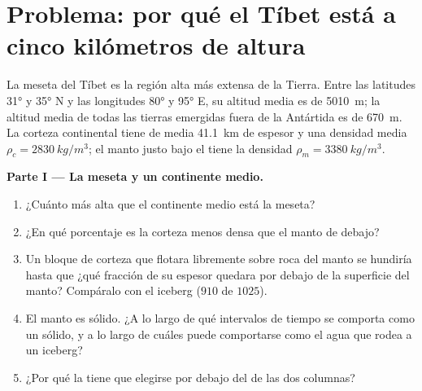 \section{Problema: por qué el Tíbet está a cinco kilómetros de altura}

\begin{problem}
\label{pb:g11:lithosphere-asthenosphere:1}
La meseta del Tíbet es la región alta más extensa de la Tierra. Entre las
latitudes \ang{31} y \ang{35} N y las longitudes \ang{80} y \ang{95} E, su
altitud media es de \qty{5010}{m}; la altitud media de todas las tierras
emergidas fuera de la Antártida es de \qty{670}{m}. La corteza continental
tiene de media \qty{41.1}{km} de espesor y una densidad media
$\rho_c = \qty{2830}{kg/m^3}$; el manto justo bajo el  tiene la densidad
$\rho_m = \qty{3380}{kg/m^3}$.

\medskip
\noindent\textbf{Parte I --- La meseta y un continente medio.}
\begin{enumerate}
  \item ¿Cuánto más alta que el continente medio está la meseta?
  \item ¿En qué porcentaje es la corteza menos densa que el manto de debajo?
  \item Un bloque de corteza que flotara libremente sobre roca del manto se
        hundiría hasta que ¿qué fracción de su espesor quedara por debajo de
        la superficie del manto? Compáralo con el iceberg ($910$ de $1025$).
  \item El manto es sólido. ¿A lo largo de qué intervalos de tiempo se
        comporta como un sólido, y a lo largo de cuáles puede comportarse
        como el agua que rodea a un iceberg?
  \item ¿Por qué la  tiene que elegirse por
        debajo del  de las dos columnas?
\end{enumerate}


\end{problem}
